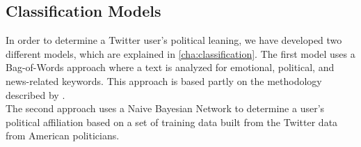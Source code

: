 \subsection{Classification Models}
In order to determine a Twitter user's political leaning, we have developed two
different models, which are explained in \autoref{cha:classification}. The first
model uses a Bag-of-Words approach where a text is analyzed for
emotional, political, and news-related keywords. This approach is based partly
on the methodology described by \citep{sarlan2014twitter}.\\
The second approach uses a Naive Bayesian Network to determine a user's
political affiliation based on a set of training data built from the Twitter
data from American politicians.

























